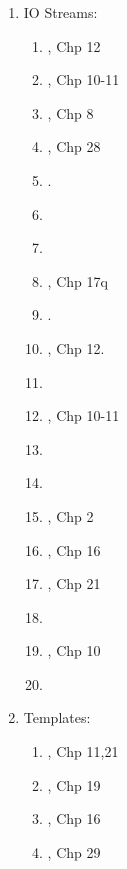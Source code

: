\begin{enumerate}
\begin{enumerate}
\begin{enumerate}
		\end{enumerate}
	\end{enumerate}
\item IO Streams: \vspace{-0.3cm}
	\begin{enumerate} \itemsep -2pt
	\item \cite{Gregoire2014}, Chp 12
	\item \cite{Stroustrup2014}, Chp 10-11
	\item \cite{Lippman2013}, Chp 8
	\item \cite{Allain2012}, Chp 28
	\item \cite[chp. 12]{Gaddis2012}.
	\item \cite[Chp. 8, pp. 351--388; pp. 4, 12--15, 49--51, 150--154, 352, 361--365, 497--498]{Horstmann2012}
	\item \cite[pp. 743--847]{Josuttis2012}
	\item \cite{Prata2012}, Chp 17q
	\item \cite[Chp. 13]{Gaddis2011}.
	\item \cite{Gaddis2010}, Chp 12.
	\item \cite[\S2.2; Chp. 6]{Savitch2009}
	\item \cite{Stroustrup2009}, Chp 10-11
	\item \cite[\S14.3-14.8]{Scheinerman2006}
	\item \cite[pp. 262--273]{Prata2005}
	\item \cite{Eckel2003}, Chp 2
	\item \cite{Oualline2003}, Chp 16
	\item \cite{Schildt2003}, Chp 21
	\item \cite[Chp. 18, pp. 417--450; Appendix A, pp. 563--580]{Schildt2003a}
	\item \cite{Vermeir2001}, Chp 10
	\item \cite[Chp. 8--9, pp. 187--235; Chp. 20--21, pp. 511--568]{Schildt1998a}
	\end{enumerate}
\item Templates: \vspace{-0.3cm}
	\begin{enumerate} \itemsep -2pt
	\item \cite{Gregoire2014}, Chp 11,21
	\item \cite{Stroustrup2014}, Chp 19
	\item \cite{Lippman2013}, Chp 16
	\item \cite{Allain2012}, Chp 29

\end{enumerate}
\end{enumerate}
